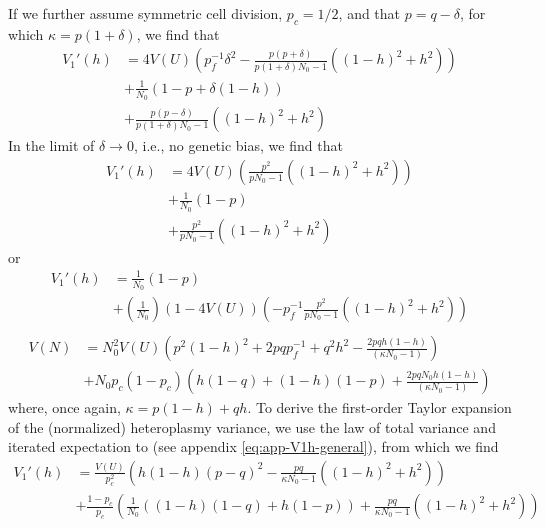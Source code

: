 \documentclass{article}
\begin{document}
\begin{appendices}
If we further assume symmetric cell division, $p_c=1/2$, and that $p=q-\delta$, for which $\kappa = p(1+\delta)$, we find that
\begin{equation}
    \begin{split}
      V_1'(h) & = 4V(U)\left(p_f^{-1}\delta^2-\frac{p(p+\delta)}{p(1+\delta)N_0-1}((1-h)^2+h^2)\right)\\
      & + \frac{1}{N_0}\left(1-p+\delta(1-h)\right)\\
      & + \frac{p(p-\delta)}{p(1+\delta)N_0-1}\left((1-h)^2+h^2\right)
    \end{split}
\end{equation}
In the limit of $\delta\rightarrow 0$, i.e., no genetic bias, we find that
\begin{equation}
    \begin{split}
      V_1'(h) & = 4V(U)\left(\frac{p^2}{pN_0-1}((1-h)^2+h^2)\right)\\
      & + \frac{1}{N_0}\left(1-p\right)\\
      & + \frac{p^2}{pN_0-1}\left((1-h)^2+h^2\right)
    \end{split}
\end{equation}
or
\begin{equation}
    \begin{split}
      V_1'(h) & = \frac{1}{N_0}\left(1-p\right)\\
      & + (\frac{1}{N_0})(1-4V(U))\left(-p_f^{-1}\frac{p^2}{pN_0-1}((1-h)^2+h^2)\right)\\
    \end{split}
\end{equation}
\begin{equation}\label{eq:mtCN_repel}
    \begin{split}
    V(N) & = N_0^2V(U)\left(p^2(1-h)^2+2pqp_f^{-1}+q^2h^2-\frac{2pq h(1-h)}{(\kappa N_0-1)}\right) \\
           & + N_0p_c(1-p_c)\left(h(1-q)+(1-h)(1-p)+\frac{2pqN_0 h (1-h)}{(\kappa N_0-1)}\right)
    \end{split}
\end{equation}
where, once again, $\kappa=p(1-h)+qh$. To derive the first-order Taylor expansion of the (normalized) heteroplasmy variance, we use the law of total variance and iterated expectation to (see appendix \ref{eq:app-V1h-general}), from which we find
\begin{equation}\label{eq:v1h-net-repel}
    \begin{split}
V_1'(h) & = \frac{V(U)}{p_c^2}\left(h(1-h) (p-q)^2-\frac{pq}{\kappa N_0-1}((1-h)^2+h^2)\right)\\
& + \frac{1-p_c}{p_c}\left(\frac{1}{N_0}((1-h)(1-q)+h(1-p))+\frac{pq}{\kappa N_0-1}((1-h)^2+h^2)\right)\\
    \end{split}
    \end{equation}


\end{appendices}
\end{document}
